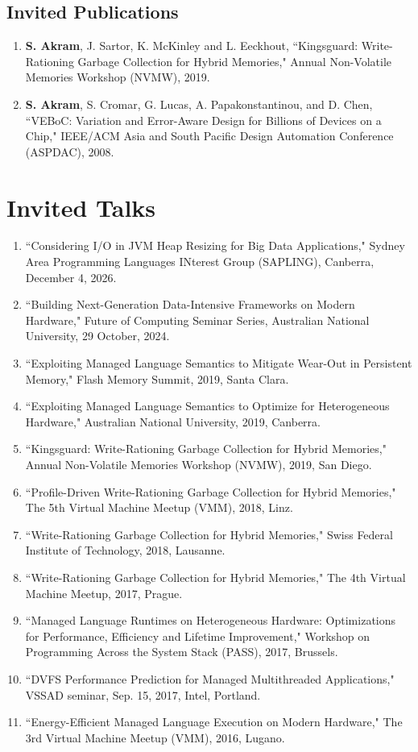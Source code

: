 \documentclass[singlecolumn,singlespace,11pt,a4paper]{article}
\begin{document}
\subsection*{Invited Publications}
\begin{enumerate}
\item
\textbf{S. Akram}, J. Sartor, K. McKinley and L. Eeckhout, ``Kingsguard: Write-Rationing Garbage Collection for Hybrid Memories," Annual Non-Volatile Memories Workshop (NVMW), 2019. 

\item
\textbf{S. Akram}, S. Cromar, G. Lucas, A. Papakonstantinou, and D. Chen, ``VEBoC: Variation and Error-Aware Design for Billions of Devices on a Chip," 
IEEE/ACM Asia and South Pacific Design Automation Conference (ASPDAC), 2008.
\end{enumerate}


\section*{Invited Talks}
\begin{enumerate}
\item ``Considering I/O in JVM Heap Resizing for Big Data Applications," Sydney Area Programming Languages INterest Group (SAPLING), Canberra, December 4, 2026.
\item ``Building Next-Generation Data-Intensive Frameworks on Modern Hardware," Future of Computing Seminar Series, Australian National University, 29 October, 2024.
\item ``Exploiting Managed Language Semantics to Mitigate Wear-Out in Persistent Memory," Flash Memory Summit, 2019, Santa Clara.
\item ``Exploiting Managed Language Semantics to Optimize for Heterogeneous Hardware," Australian National University, 2019, Canberra.
\item ``Kingsguard: Write-Rationing Garbage Collection for Hybrid Memories," Annual Non-Volatile Memories Workshop (NVMW), 2019, San Diego.
\item ``Profile-Driven Write-Rationing Garbage Collection for Hybrid Memories," The 5th Virtual Machine Meetup (VMM), 2018, Linz.
\item ``Write-Rationing Garbage Collection for Hybrid Memories," Swiss Federal Institute of Technology, 2018, Lausanne.
\item ``Write-Rationing Garbage Collection for Hybrid Memories," The 4th Virtual Machine Meetup, 2017, Prague.
\item ``Managed Language Runtimes on Heterogeneous Hardware: Optimizations for Performance, Efficiency and Lifetime Improvement," Workshop on Programming Across the System Stack (PASS), 2017, Brussels.
\item ``DVFS Performance Prediction for Managed Multithreaded Applications," VSSAD seminar, Sep. 15, 2017, Intel, Portland.
\item ``Energy-Efficient Managed Language Execution on Modern Hardware," The 3rd Virtual Machine Meetup (VMM), 2016, Lugano.
\end{enumerate}
\end{document}
